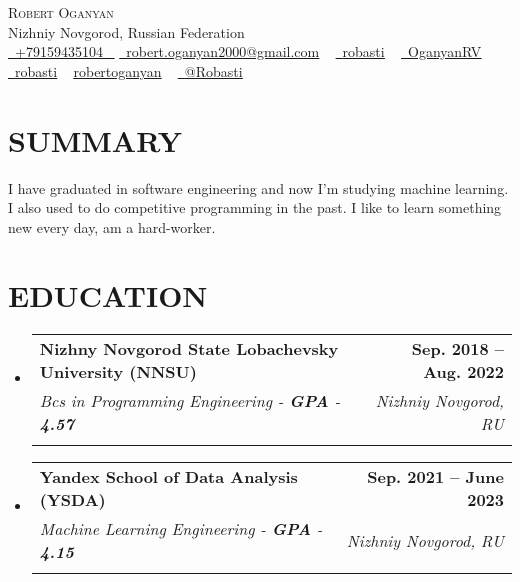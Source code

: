 \documentclass[letterpaper,11pt]{article}
\makeatletter
\newcommand{\resumeSubheading}[5]{
  \vspace{-2pt}\item
    \begin{tabular*}{1.0\textwidth}[t]{l@{\extracolsep{\fill}}r}
      \textbf{\large#1} & \textbf{\small #2} \\
      \textit{\large#3} & \textit{\small #4} \\
      \textit{\large#5} \\
      
    \end{tabular*}\vspace{-7pt}
}
\newcommand{\resumeSubHeadingListStart}{\begin{itemize}[leftmargin=0.0in, label={}]}
\newcommand{\resumeSubHeadingListEnd}{\end{itemize}}
\makeatother
\begin{document}


\begin{center}
    {\Huge \scshape Robert Oganyan} \\ \vspace{1pt}
    Nizhniy Novgorod, Russian Federation \\ \vspace{1pt}
    \small \href{tel:+xxxxxxxxxxxx}{ \raisebox{-0.1\height}\faPhone\ \underline{+79159435104} ~} 
    \href{mailto:yourname@gmail.com}{\raisebox{-0.2\height}\faEnvelope\  \underline{robert.oganyan2000@gmail.com}} ~ 
    \href{https://t.me/robasti}{\raisebox{-0.2\height}\faTelegram\ \underline{robasti}} ~
    \href{https://github.com/OganyanRV}{\raisebox{-0.2\height}\faGithub\ \underline{OganyanRV}} ~
    \href{https://codeforces.com/profile/robasti}{\raisebox{-0.2\height}\faPoll\ \underline{robasti}} ~
    \href{https://www.kaggle.com/robertoganyan}{\raisebox{-0.2\height}\faKaggle\underline{robertoganyan}} ~
    \href{https://medium.com/@Robasti}{\raisebox{-0.2\height}\faMedium\ \underline{@Robasti}}
    \vspace{-8pt}
\end{center}

\section{SUMMARY}
I have graduated in software engineering and now I'm studying machine learning. I also used to do competitive programming in the past. I like to learn something new every day, am a hard-worker.

\section{EDUCATION}
  \resumeSubHeadingListStart
    \resumeSubheading
      {Nizhny Novgorod State Lobachevsky University (NNSU)}{Sep. 2018 -- Aug. 2022}
      {Bcs in Programming Engineering - \textbf{GPA} - \textbf{4.57}}{Nizhniy Novgorod, RU}
      {}
  \resumeSubHeadingListEnd
  
  \resumeSubHeadingListStart
    \resumeSubheading
      {Yandex School of Data Analysis (YSDA)}{Sep. 2021 -- June 2023}
      {Machine Learning Engineering  - \textbf{GPA} - \textbf{4.15}}{Nizhniy Novgorod, RU}
      {}
  \resumeSubHeadingListEnd
\end{document}
